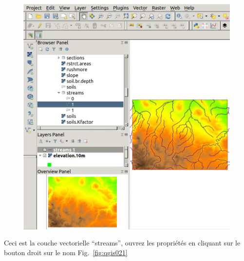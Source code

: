\begin{figure}[htbp]
   \centering
   \includegraphics[scale=0.25]{qgis020.png}
   \caption{}
   \label{fig:qgis020}
\end{figure}

Ceci est la couche vectorielle ``streams'', ouvrez les propri\'et\'es en cliquant sur le bouton droit sur le nom Fig.~\ref{fig:qgis021}

